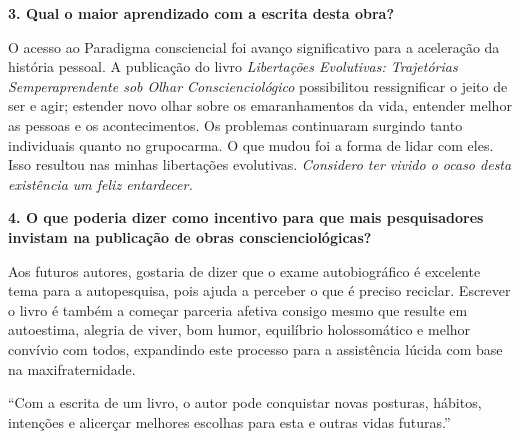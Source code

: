 \documentclass{gescons}
\begin{document}
\begin{multicols}{2}
\textbf{3. Qual o maior aprendizado com a escrita desta obra?}


O acesso ao Paradigma consciencial foi avanço significativo para a aceleração da história pessoal. A publicação do livro \emph{Libertações Evolutivas: Trajetórias Semperaprendente sob Olhar Conscienciológico} possibilitou ressignificar o jeito de ser e agir; estender novo olhar sobre os emaranhamentos da vida, entender melhor as pessoas e os acontecimentos. Os problemas continuaram surgindo tanto individuais quanto no grupocarma. O que mudou foi a forma de lidar com eles. Isso resultou nas minhas libertações evolutivas. \emph{Considero ter vivido o ocaso desta existência um feliz entardecer.}

\textbf{4. O que poderia dizer como incentivo para que mais pesquisadores invistam na publicação de obras conscienciológicas?}

Aos futuros autores, gostaria de dizer que o exame autobiográfico é excelente tema para a autopesquisa, pois ajuda a perceber o que é preciso reciclar. Escrever o livro é também a começar parceria afetiva consigo mesmo que resulte em autoestima, alegria de viver, bom humor, equilíbrio holos­somático e melhor convívio com todos, expandindo este processo para a assis­tência lúcida com base na maxifraternidade.


\begin{pullquote}
``Com a escrita de um livro, o autor pode conquistar novas posturas, hábitos, intenções e   alicerçar melhores escolhas para esta e outras vidas futuras.''
\end{pullquote}
    
    \end{multicols}
\end{document}

